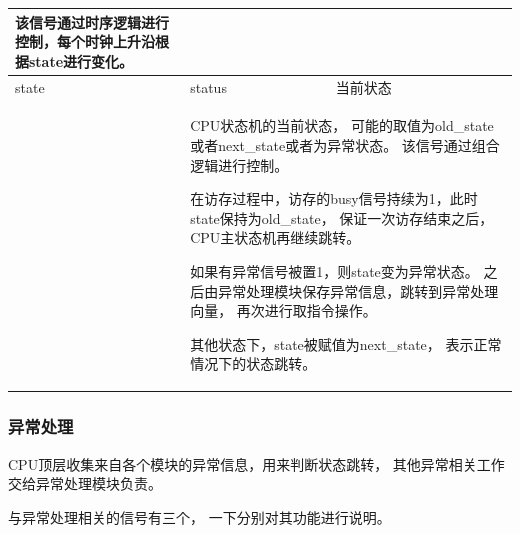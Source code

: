 \begin{tabularx}{\textwidth}{lll}
{                    该信号通过时序逻辑进行控制，每个时钟上升沿根据state进行变化。
                } \\
                \midrule
                state             & status        & 当前状态 \\
                \cmidrule(l){2-3}
                &
                \multicolumn{2}{X}{
                    CPU状态机的当前状态，
                    可能的取值为old\_state或者next\_state或者为异常状态。
                    该信号通过组合逻辑进行控制。

                    在访存过程中，访存的busy信号持续为1，此时state保持为old\_state，
                    保证一次访存结束之后，CPU主状态机再继续跳转。

                    如果有异常信号被置1，则state变为异常状态。
                    之后由异常处理模块保存异常信息，跳转到异常处理向量，
                    再次进行取指令操作。

                    其他状态下，state被赋值为next\_state，
                    表示正常情况下的状态跳转。
                } \\
                \bottomrule
            \end{tabularx}

        \subsubsection{异常处理}
            CPU顶层收集来自各个模块的异常信息，用来判断状态跳转，
            其他异常相关工作交给异常处理模块负责。

            与异常处理相关的信号有三个，
            一下分别对其功能进行说明。

